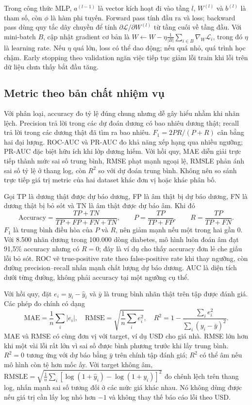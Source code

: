 \documentclass[12pt,a4paper]{report}
\begin{document}
Trong công thức MLP, $a^{(l-1)}$ là vector kích hoạt đi vào tầng $l$, $W^{(l)}$ và $b^{(l)}$ là tham số, còn $\phi$ là hàm phi tuyến. Forward pass tính đầu ra và loss; backward pass dùng quy tắc dây chuyền để tính $\partial\mathcal L/\partial W^{(l)}$ từ tầng cuối về tầng đầu. Với mini-batch $B$, cập nhật gradient cơ bản là $W\leftarrow W-\eta\frac1{|B|}\sum_{i\in B}\nabla_W\mathcal L_i$, trong đó $\eta$ là learning rate. Nếu $\eta$ quá lớn, loss có thể dao động; nếu quá nhỏ, quá trình học chậm. Early stopping theo validation ngăn việc tiếp tục giảm lỗi train khi lỗi trên dữ liệu chưa thấy bắt đầu tăng.

\subsection{Metric theo bản chất nhiệm vụ}
Với phân loại, accuracy đo tỷ lệ đúng chung nhưng dễ gây hiểu nhầm khi nhãn lệch. Precision trả lời trong các dự đoán dương có bao nhiêu dương thật; recall trả lời trong các dương thật đã tìm ra bao nhiêu. $F_1=2PR/(P+R)$ cân bằng hai đại lượng. ROC-AUC và PR-AUC đo khả năng xếp hạng qua nhiều ngưỡng; PR-AUC đặc biệt hữu ích khi lớp dương hiếm. Với hồi quy, MAE diễn giải trực tiếp thành mức sai số trung bình, RMSE phạt mạnh ngoại lệ, RMSLE phản ánh sai số tỷ lệ ở thang log, còn $R^2$ so với dự đoán trung bình. Không nên so sánh trực tiếp giá trị metric của hai dataset khác đơn vị hoặc khác phân bố.

Gọi TP là dương thật được dự báo dương, FP là âm thật bị dự báo dương, FN là dương thật bị bỏ sót và TN là âm thật được dự báo âm. Khi đó
\begin{equation}
\mathrm{Accuracy}=\frac{TP+TN}{TP+FP+FN+TN},\qquad
P=\frac{TP}{TP+FP},\qquad R=\frac{TP}{TP+FN}.
\end{equation}
$F_1$ là trung bình điều hòa của $P$ và $R$, nên giảm mạnh nếu một trong hai gần 0. Với 8.500 nhãn dương trong 100.000 dòng diabetes, mô hình luôn đoán âm đạt 91,5\% accuracy nhưng có $R=0$; đây là ví dụ cho thấy accuracy đơn lẻ che giấu lỗi bỏ sót. ROC vẽ true-positive rate theo false-positive rate khi thay ngưỡng, còn đường precision--recall nhấn mạnh chất lượng dự báo dương. AUC là diện tích dưới từng đường, không phải accuracy tại một ngưỡng cụ thể.

Với hồi quy, đặt $e_i=y_i-\hat y_i$ và $\bar y$ là trung bình nhãn thật trên tập được đánh giá. Các phép đo chính có dạng
\begin{equation}
\mathrm{MAE}=\frac1n\sum_i|e_i|,\quad
\mathrm{RMSE}=\sqrt{\frac1n\sum_i e_i^2},\quad
R^2=1-\frac{\sum_i e_i^2}{\sum_i(y_i-\bar y)^2}.
\end{equation}
MAE và RMSE có cùng đơn vị với target, ví dụ USD cho giá nhà. RMSE lớn hơn khi một vài lỗi rất lớn vì sai số được bình phương trước khi lấy trung bình. $R^2=0$ tương ứng với dự báo bằng $\bar y$ trên chính tập đánh giá; $R^2$ có thể âm nếu mô hình còn tệ hơn mốc ấy. Với target không âm, $\mathrm{RMSLE}=\sqrt{\frac1n\sum_i[\log(1+\hat y_i)-\log(1+y_i)]^2}$ đo chênh lệch trên thang log, nhấn mạnh sai số tương đối ở các mức giá khác nhau. Nó không dùng được nếu giá trị cần lấy log nhỏ hơn $-1$ và không thay thế báo cáo lỗi theo USD.
\end{document}
